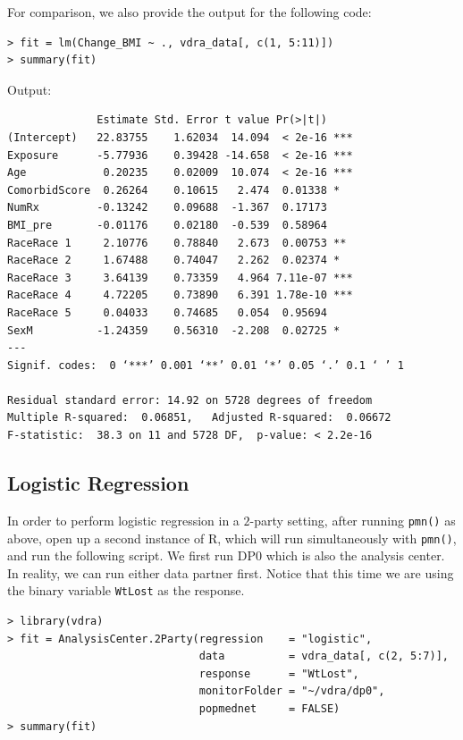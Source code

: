 \documentclass[12]{article}
\begin{document}
For comparison, we also provide the output for the following code:

\begin{verbatim}
> fit = lm(Change_BMI ~ ., vdra_data[, c(1, 5:11)])
> summary(fit)
\end{verbatim}

Output:

\begin{verbatim}
              Estimate Std. Error t value Pr(>|t|)    
(Intercept)   22.83755    1.62034  14.094  < 2e-16 ***
Exposure      -5.77936    0.39428 -14.658  < 2e-16 ***
Age            0.20235    0.02009  10.074  < 2e-16 ***
ComorbidScore  0.26264    0.10615   2.474  0.01338 *  
NumRx         -0.13242    0.09688  -1.367  0.17173    
BMI_pre       -0.01176    0.02180  -0.539  0.58964    
RaceRace 1     2.10776    0.78840   2.673  0.00753 ** 
RaceRace 2     1.67488    0.74047   2.262  0.02374 *  
RaceRace 3     3.64139    0.73359   4.964 7.11e-07 ***
RaceRace 4     4.72205    0.73890   6.391 1.78e-10 ***
RaceRace 5     0.04033    0.74685   0.054  0.95694    
SexM          -1.24359    0.56310  -2.208  0.02725 *  
---
Signif. codes:  0 ‘***’ 0.001 ‘**’ 0.01 ‘*’ 0.05 ‘.’ 0.1 ‘ ’ 1

Residual standard error: 14.92 on 5728 degrees of freedom
Multiple R-squared:  0.06851,	Adjusted R-squared:  0.06672 
F-statistic:  38.3 on 11 and 5728 DF,  p-value: < 2.2e-16
\end{verbatim}

\subsection{Logistic Regression}

In order to perform logistic regression in a $2$-party setting, after running \verb"pmn()" as above, open up a second instance of R, which will run simultaneously with \verb"pmn()", and run the following script.  We first run DP0 which is also the analysis center.  In reality, we can run either data partner first.    Notice that this time we are using the binary variable \verb"WtLost" as the response.

\begin{verbatim}
> library(vdra)
> fit = AnalysisCenter.2Party(regression    = "logistic",
                              data          = vdra_data[, c(2, 5:7)],
                              response      = "WtLost",
                              monitorFolder = "~/vdra/dp0",
                              popmednet     = FALSE)
> summary(fit)
\end{verbatim}
\end{document}
